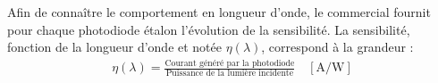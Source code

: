 \documentclass[twoside,a4paper,11pt,addpoints,answers]{exam}%
\newcounter{foo} %
\begin{document}
Afin de connaître le comportement en longueur d'onde, le commercial fournit pour chaque photodiode étalon l'évolution de la sensibilité. La sensibilité, fonction de la longueur d'onde et notée $\eta (\lambda)$, correspond à la grandeur : 
\begin{align*}
\eta (\lambda) = \frac{\text{Courant généré par la photodiode}}{\text{Puissance de la lumière incidente}} \quad [\si{\ampere\per\watt}]
\end{align*}

\end{document}
